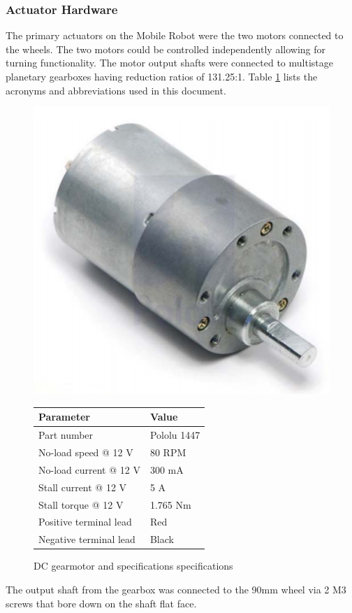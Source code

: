 \documentclass[11pt,a4paper]{article}
\begin{document}
    \subsubsection{Actuator Hardware}
      The primary actuators on the Mobile Robot were the two motors connected to the wheels. The two motors could be controlled independently allowing for turning functionality. The motor output shafts were connected to multistage planetary gearboxes having reduction ratios of 131.25:1.
      Table \ref{gearmotor} lists the acronyms and abbreviations used in this document.
      \begin{figure}[h]
        \begin{minipage}[b]{0.50\linewidth}
          \raggedleft
          \includegraphics{gearmotor.png}
        \end{minipage}
        \begin{minipage}[b]{0.30\linewidth}

          \begin{tabular}[b]{|l|l|}

            \hline \textbf{Parameter} & \textbf{Value} \\
            \hline Part number & Pololu 1447\\
            \hline No-load speed @ 12 V & 80 RPM\\
            \hline No-load current @ 12 V & 300 mA\\
            \hline Stall current @ 12 V & 5 A\\
            \hline Stall torque @ 12 V & 1.765 Nm\\
            \hline Positive terminal lead & Red\\
            \hline Negative terminal lead & Black\\
            \hline
          \end{tabular}
        \end{minipage}
        \caption{DC gearmotor and specifications specifications}
        \label{gearmotor}
      \end{figure}
      The output shaft from the gearbox was connected to the 90mm wheel via 2 M3 screws that bore down on the shaft flat face.
\end{document}
